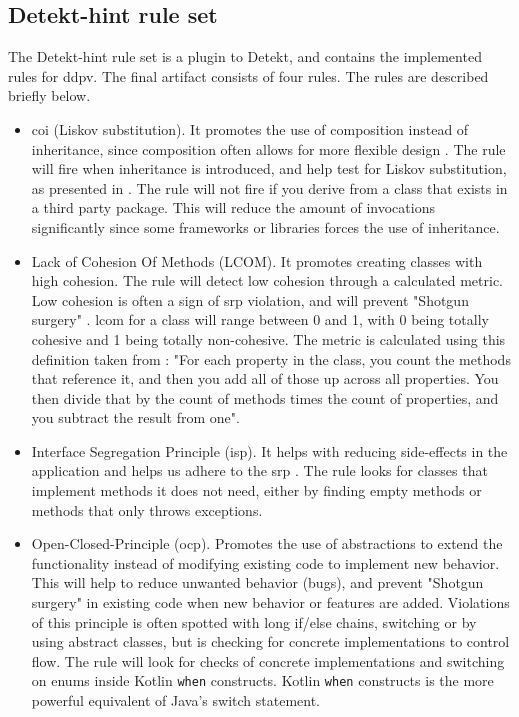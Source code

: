 \documentclass[pdftex,10pt,b5paper,twoside]{report}
\begin{document}
\subsection{Detekt-hint rule set}
The Detekt-hint rule set is a plugin to Detekt, and contains the implemented rules for \gls{ddpv}. The final artifact consists of four rules. The rules are described briefly below.

\begin{itemize}
    \item\gls{coi} (Liskov substitution). It promotes the use of composition instead of inheritance, since composition often allows for more flexible design \cite{composition-over-inheritance-wiki}. The rule will fire when inheritance is introduced, and help test for Liskov substitution, as presented in \cite{composition-over-inheritance-stackoverflow}. The rule will not fire if you derive from a class that exists in a third party package. This will reduce the amount of invocations significantly since some frameworks or libraries forces the use of inheritance.
    
    \item Lack of Cohesion Of Methods (LCOM). It promotes creating classes with high cohesion. The rule will detect low cohesion through a calculated metric. Low cohesion is often a sign of \gls{srp} violation, and will prevent "Shotgun surgery" \cite{lcomdescription}. \gls{lcom} for a class will range between 0 and 1, with 0 being totally cohesive and 1 being totally non-cohesive. The metric is calculated using this definition taken from \cite{lcomdescription}: "For each property in the class, you count the methods that reference it, and then you add all of those up across all properties. You then divide that by the count of methods times the count of properties, and you subtract the result from one".
    
    \item Interface Segregation Principle (\gls{isp}). It helps with reducing side-effects in the application and helps us adhere to the \gls{srp} \cite{isp-violation}. The rule looks for classes that implement methods it does not need, either by finding empty methods or methods that only throws exceptions.
    
    \item Open-Closed-Principle (\gls{ocp}). Promotes the use of abstractions to extend the functionality instead of modifying existing code to implement new behavior. This will help to reduce unwanted behavior (bugs), and prevent "Shotgun surgery" in existing code when new behavior or features are added. Violations of this principle is often spotted with long if/else chains, switching or by using abstract classes, but is checking for concrete implementations to control flow\cite{ocp3}. The rule will look for checks of concrete implementations and switching on enums inside Kotlin \texttt{when} constructs. Kotlin \texttt{when} constructs is the more powerful equivalent of Java's switch statement.
\end{itemize}
\end{document}

